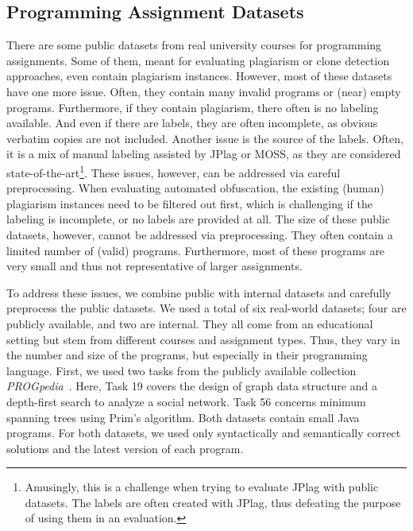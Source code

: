 \subsection{Programming Assignment Datasets}
There are some public datasets from real university courses for programming assignments. Some of them, meant for evaluating plagiarism or clone detection approaches, even contain plagiarism instances.
However, most of these datasets have one more issue. Often, they contain many invalid programs or (near) empty programs. Furthermore, if they contain plagiarism, there often is no labeling available. And even if there are labels, they are often incomplete, as obvious verbatim copies are not included. Another issue is the source of the labels. Often, it is a mix of manual labeling assisted by JPlag or MOSS, as they are considered state-of-the-art\footnote{Amusingly, this is a challenge when trying to evaluate JPlag with public datasets. The labels are often created with JPlag, thus defeating the purpose of using them in an evaluation.}.
These issues, however, can be addressed via careful preprocessing.
When evaluating automated obfuscation, the existing (human) plagiarism instances need to be filtered out first, which is challenging if the labeling is incomplete, or no labels are provided at all.
%
The size of these public datasets, however, cannot be addressed via preprocessing. They often contain a limited number of (valid) programs. Furthermore, most of these programs are very small and thus not representative of larger assignments.

To address these issues, we combine public with internal datasets and carefully preprocess the public datasets.
We used a total of six real-world datasets; four are publicly available, and two are internal. They all come from an educational setting but stem from different courses and assignment types.
Thus, they vary in the number and size of the programs, but especially in their programming language.
First, we used two tasks from the publicly available collection \textit{PROGpedia}~\cite{paiva2023}.
Here, Task 19 covers the design of graph data structure and a depth-first search to analyze a social network.
Task 56 concerns minimum spanning trees using Prim's algorithm. Both datasets contain small Java programs.
For both datasets, we used only syntactically and semantically correct solutions and the latest version of each program.

